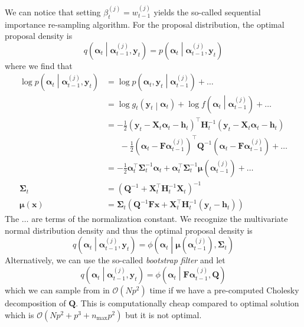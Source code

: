 \documentclass[notitlepage]{article}
\renewcommand{\vec}[1]{\bm{#1}}
\newcommand{\mat}[1]{\mathbf{#1}}
\newcommand{\Lparen}[1]{\left( #1\right)}
\newcommand{\Cond}[2]{ #1 \middle\vert  #2}
\newcommand{\optor}[2]{#1\Lparen{#2}}
\newcommand{\optorC}[3]{\optor{#1}{\Cond{#2}{#3}}}
\newcommand{\pdensC}[2]{\optorC{p}{#1}{#2}}
\newcommand{\normaldC}[3]{\optorC{\phi}{#1}{#2,#3}}
\newcommand{\IDC}[2]{\optorC{q}{#1}{#2}}
\newcommand{\partic}[3]{#1_{#2}^{\Lparen{#3}}}
\newcommand{\bigO}[1]{\mathcal{O}\Lparen{#1}}
\newcommand{\dimState}{p}
\newcommand{\nPart}{N}
\newcommand{\nMax}{n_{\text{max}}}
\begin{document}
%  
We can notice that setting $\partic\beta tj = \partic w{t-1}j$ yields the 
so-called sequential importance 
re-sampling algorithm. For the proposal distribution, the optimal proposal density is%
%
$$
\IDC{\vec\alpha_t}{\partic{\vec\alpha}{t-1}j, \vec y_t} 
	= \pdensC{\vec\alpha_t}{\partic{\vec\alpha}{t-1}j, \vec y_t}
$$%
% 
where we find that %
%
\begin{align}
\log \pdensC{\vec\alpha_t}{\partic{\vec\alpha}{t-1}j, \vec y_t} 
	&=\log \pdensC{\vec\alpha_t, \vec y_t}{\partic{\vec\alpha}{t-1}j} + \dots 
	\nonumber\\
	&=\log \optorC{g_t}{\vec y_t}{\vec{\alpha}_t} + 
		\log\optorC{f}{\vec\alpha_t}{\partic{\vec\alpha}{t-1}j} + \dots 
		\nonumber\\
	&= -\frac 12\Lparen{\vec y_t - \mat X_t\vec \alpha_t - \vec h_t}^\top 
		\mat H^{-1}_t\Lparen{\vec y_t - \mat X_t\vec\alpha_t - \vec h_t} 
		\nonumber\\
		&\hspace{20pt}-\frac 12\Lparen{\vec\alpha_t - \mat F\partic{\vec\alpha}{t-1}j}^\top\mat Q^{-1}
		\Lparen{\vec\alpha_t - \mat F\partic{\vec\alpha}{t-1}j} + \dots 
		\nonumber\\
	&= - \frac 12\vec\alpha_t^\top\mat\Sigma^{-1}_t\vec\alpha_t
		+\vec\alpha_t^\top\mat \Sigma^{-1}_t\vec\mu\Lparen{\partic{\vec\alpha}{t-1}j} + \dots \nonumber\\
\mat\Sigma_t &= \Lparen{\mat Q^{-1} + \mat X_t^\top\mat H_t^{-1}\mat X_t}^{-1} 
	\label{eq:fwNormProCovar}\\
\vec\mu(\vec x) &= \mat\Sigma_t\Lparen{
	\mat Q^{-1}\mat F\vec x + \mat X^\top_t\mat H_t^{-1} (\vec y_t - \vec h_t)}
	\label{eq:fwNormProMean}
\end{align}%
% 
The $\dots$ are terms of the normalization constant. We recognize the multivariate normal distribution density and thus the optimal proposal density is %
%
$$\IDC{\vec\alpha_t}{\partic{\vec\alpha}{t-1}j, \vec y_t}  
	= \normaldC{\vec\alpha_t}{\vec\mu(\partic{\vec\alpha}{t-1}j)}{\mat\Sigma_t}
$$%
%
Alternatively, we can use the so-called \emph{bootstrap filter} and let%
%
\begin{equation}\label{eq:bootFW}
	\IDC{\vec{\alpha}_t}{\partic{\vec{\alpha}}{t-1}{j}, \vec{y}_t} = %
		\normaldC{\vec\alpha_t}{\mat{F}\partic{\vec{\alpha}}{t-1}{j}}{\mat{Q}}
\end{equation}%
%
which we can sample from in $\bigO{\nPart \dimState^2}$ time if we have a pre-computed Cholesky 
decomposition of $\mat{Q}$. This is computationally cheap 
compared to optimal solution which is $\bigO{\nPart \dimState^2  + \dimState^3 + \nMax \dimState^2}$ but it is not optimal.
\end{document}
